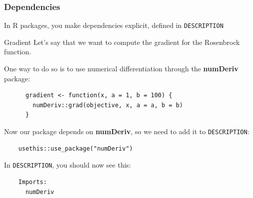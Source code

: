 \documentclass[aspectratio=1610,onlytextwidth]{beamer}
\begin{document}
\begin{frame}[c,fragile]
  \frametitle{Dependencies}

  In R packages, you make dependencies explicit, defined in \texttt{DESCRIPTION}

  \medskip\pause

  \begin{block}{Gradient}
    Let's say that we want to compute the gradient for the Rosenbrock function.

    \medskip\pause

    One way to do so is to use numerical differentiation through the \textbf{numDeriv} package:

    \begin{lstlisting}
      gradient <- function(x, a = 1, b = 100) {
        numDeriv::grad(objective, x, a = a, b = b)
      }
    \end{lstlisting}
  \end{block}

  Now our package depends on \textbf{numDeriv}, so we need to add it
  to \texttt{DESCRIPTION}:
  \begin{lstlisting}
    usethis::use_package("numDeriv")
  \end{lstlisting}

  \medskip\pause

  In \texttt{DESCRIPTION}, you should now see this:

  \begin{lstlisting}
    Imports: 
      numDeriv
  \end{lstlisting}

\end{frame}
\end{document}
